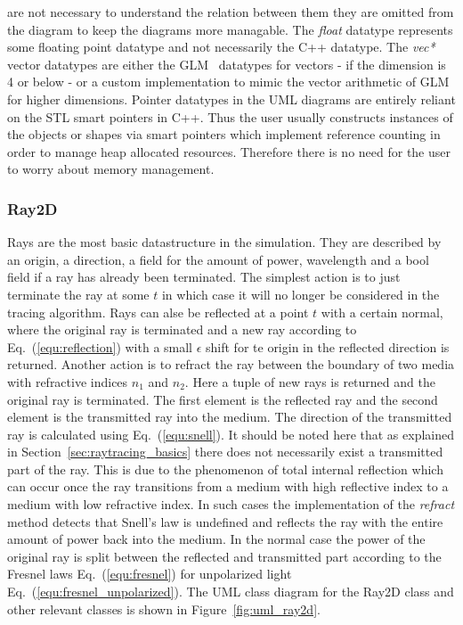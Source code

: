 \documentclass[a4paper,10pt]{article}
\newcommand{\equref}[1]{Eq.~(\ref{#1})}
\newcommand{\secref}[1]{Section~\ref{#1}}
\newcommand{\figref}[1]{Figure~\ref{#1}}
\begin{document}
    are not necessary to understand the relation between them
    they are omitted from the diagram to keep the diagrams more
    managable.
    The \emph{float} datatype represents some floating point datatype
    and not necessarily the C++ datatype.
    The \emph{vec*} vector datatypes are either the GLM~\cite{glm} datatypes
    for vectors - if the dimension is 4 or below - or a custom implementation
    to mimic the vector arithmetic of GLM for higher dimensions.
    Pointer datatypes in the UML diagrams are entirely reliant on
    the STL smart pointers in C++.
    Thus the user usually constructs instances of the objects or shapes
    via smart pointers which implement reference counting
    in order to manage heap allocated resources.
    Therefore there is no need for the user to worry about 
    memory management. 

    \subsubsection{Ray2D}

    Rays are the most basic datastructure in the simulation.
    They are described by an origin, a direction, a field for the
    amount of power, wavelength and a bool field if a ray has
    already been terminated.
    The simplest action is to just terminate the ray at some $t$
    in which case it will no longer be considered in the tracing
    algorithm.
    Rays can alse be reflected at a point $t$ with a certain normal, 
    where the original ray is terminated and a new ray according to \equref{equ:reflection} with a small
    $\epsilon$ shift for te origin in the reflected direction is returned.
    Another action is to refract the ray between the boundary
    of two media with refractive indices $n_1$ and $n_2$.
    Here a tuple of new rays is returned and the original ray
    is terminated.
    The first element is the reflected ray and the second
    element is the transmitted ray into the medium.
    The direction of the transmitted ray is calculated using
    \equref{equ:snell}.
    It should be noted here that as explained in
    \secref{sec:raytracing_basics}
    there does not necessarily exist a transmitted part of the ray.
    This is due to the phenomenon of total internal reflection
    which can occur once the ray transitions from a medium with high
    reflective index to a medium with low refractive index.
    In such cases the implementation of the \emph{refract} method
    detects that Snell's law is undefined and reflects the ray
    with the entire amount of power back into the medium.
    In the normal case the power of the original ray
    is split between the reflected and transmitted part according
    to the Fresnel laws \equref{equ:fresnel} for unpolarized
    light \equref{equ:fresnel_unpolarized}. 
    The UML class diagram for the Ray2D class and other relevant
    classes is shown in \figref{fig:uml_ray2d}.
\end{document}
